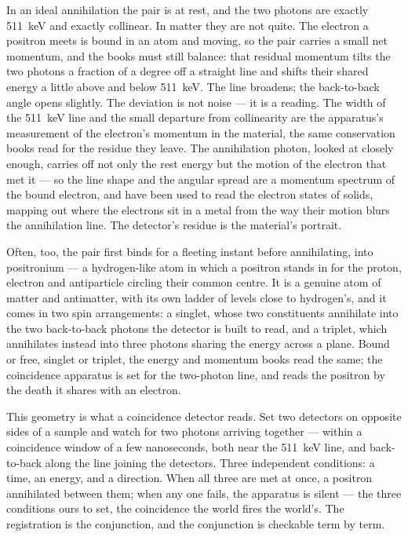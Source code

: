 In an ideal annihilation the pair is at rest, and the two photons are exactly 511~keV and exactly collinear. In
matter they are not quite. The electron a positron meets is bound in an atom and moving, so the pair carries a
small net momentum, and the books must still balance: that residual momentum tilts the two photons a fraction
of a degree off a straight line and shifts their shared energy a little above and below 511~keV. The line
broadens; the back-to-back angle opens slightly. The deviation is not noise --- it is a reading. The width of
the 511~keV line and the small departure from collinearity are the apparatus's measurement of the electron's
momentum in the material, the same conservation books read for the residue they leave. The annihilation
photon, looked at closely enough, carries off not only the rest energy but the motion of the electron that met
it --- so the line shape and the angular spread are a momentum spectrum of the bound electron, and have been
used to read the electron states of solids, mapping out where the electrons sit in a metal from the way their
motion blurs the annihilation line. The detector's residue is the material's portrait.

Often, too, the pair first binds for a fleeting instant before annihilating, into positronium --- a
hydrogen-like atom in which a positron stands in for the proton, electron and antiparticle circling their
common centre. It is a genuine atom of matter and antimatter, with its own ladder of levels close to
hydrogen's, and it comes in two spin arrangements: a singlet, whose two constituents annihilate into the two
back-to-back photons the detector is built to read, and a triplet, which annihilates instead into three
photons sharing the energy across a plane. Bound or free, singlet or triplet, the energy and momentum books
read the same; the coincidence apparatus is set for the two-photon line, and reads the positron by the death it
shares with an electron.

This geometry is what a coincidence detector reads. Set two detectors on opposite sides of a sample and watch
for two photons arriving together --- within a coincidence window of a few nanoseconds, both near the 511~keV
line, and back-to-back along the line joining the detectors. Three independent conditions: a time, an energy,
and a direction. When all three are met at once, a positron annihilated between them; when any one fails, the
apparatus is silent --- the three conditions ours to set, the coincidence the world fires the world's. The
registration is the conjunction, and the conjunction is checkable term by term.

